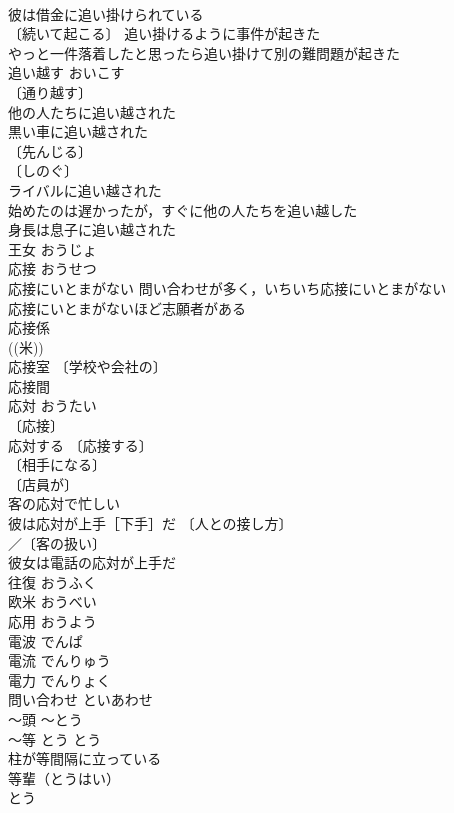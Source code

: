 \documentclass[8pt]{extreport}
\begin{document}
\begin{CJK}{UTF8}{min}
\\	彼は借金に追い掛けられている 
\\	〔続いて起こる〕 追い掛けるように事件が起きた 
\\	やっと一件落着したと思ったら追い掛けて別の難問題が起きた 
\\	追い越す	おいこす	
\\	〔通り越す〕
\\	他の人たちに追い越された 
\\	黒い車に追い越された 
\\	〔先んじる〕
\\	〔しのぐ〕
\\	ライバルに追い越された 
\\	始めたのは遅かったが，すぐに他の人たちを追い越した 
\\	身長は息子に追い越された 
\\	王女	おうじょ	
\\	応接	おうせつ	
\\	応接にいとまがない 問い合わせが多く，いちいち応接にいとまがない 
\\	応接にいとまがないほど志願者がある 
\\	応接係 
\\	((米)) 
\\	応接室 〔学校や会社の〕
\\	応接間 
\\	応対	おうたい	
\\	〔応接〕
\\	応対する 〔応接する〕
\\	〔相手になる〕
\\	〔店員が〕
\\	客の応対で忙しい 
\\	彼は応対が上手［下手］だ 〔人との接し方〕
\\	／〔客の扱い〕
\\	彼女は電話の応対が上手だ 
\\	往復	おうふく	
\\	欧米	おうべい	
\\	応用	おうよう	
\\	電波	でんぱ	
\\	電流	でんりゅう	
\\	電力	でんりょく	
\\	問い合わせ	といあわせ	
\\	～頭	～とう	
\\	～等	とう	とう
\\	柱が等間隔に立っている 
\\	等輩（とうはい） 
\\	とう 

\end{CJK}
\end{document}
